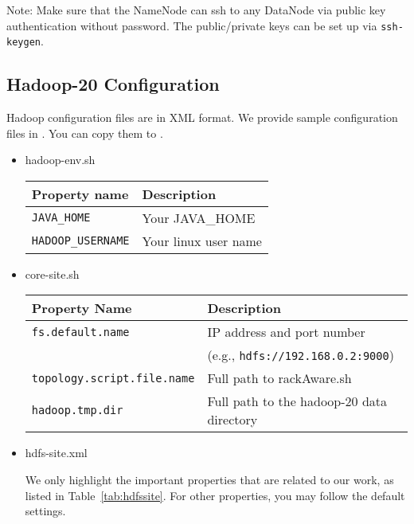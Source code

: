 \documentclass[letterpaper,12pt]{article}
\begin{document}
Note: Make sure that the NameNode can ssh to any DataNode via public key
authentication without password.  The public/private keys can be set up via
{\tt ssh-keygen}.

\subsection{Hadoop-20 Configuration}

Hadoop configuration files are in XML format.  We provide sample configuration
files in .  You can copy them to
.

\begin{itemize}

\item hadoop-env.sh

\begin{center}
\begin{tabular}{|l|l|}
\hline
{\bf Property name} & {\bf Description} \\
\hline
{\tt JAVA\_HOME} & Your JAVA\_HOME \\
\hline
{\tt HADOOP\_USERNAME} & Your linux user name \\
\hline
\end{tabular}
\end{center}

\item core-site.sh

\begin{center}
\begin{tabular}{|p{2.5in}|p{3in}|}
\hline
{\bf Property Name} & {\bf Description} \\
\hline
{\tt fs.default.name}  & IP address and port number \\
		& (e.g., {\tt hdfs://192.168.0.2:9000}) \\
\hline
{\tt topology.script.file.name} & Full path to rackAware.sh\\
\hline
{\tt hadoop.tmp.dir} & Full path to the hadoop-20 data directory \\
\hline
\end{tabular}
\end{center}

\item hdfs-site.xml

We only highlight the important properties that are related to our work, as
listed in Table~\ref{tab:hdfssite}.  For other properties, you may follow the
default settings.


\end{itemize}
\end{document}
